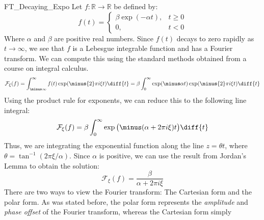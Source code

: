         \begin{lexample}{}{FT_Decaying_Expo}
            Let $f:\mathbb{R}\rightarrow\mathbb{R}$ be defined by:
            \begin{equation}
                f(t)=
                \begin{cases}
                    \beta\exp(\minus\alpha{t}),&t\geq{0}\\
                    0,&t<0
                \end{cases}
            \end{equation}
            Where $\alpha$ and $\beta$ are positive real numbers.
            Since $f(t)$ decays to zero rapidly as
            $t\rightarrow\infty$, we see that $f$ is a
            Lebesgue integrable function and has a Fourier
            transform. We can compute this using the standard
            methods obtained from a course on integral calculus.
            \begin{equation}
                \mathcal{F}_{\xi}(f)=\int_{\minus\infty}^{\infty}f(t)
                                        \exp(\minus{2}\pi{i}\xi{t})\diff{t}
                                    =\beta\int_{0}^{\infty}
                                        \exp(\minus\alpha{t})
                                        \exp(\minus{2}\pi{i}\xi{t})\diff{t}
            \end{equation}
            Using the product rule for exponents, we can
            reduce this to the following line integral:
            \begin{equation}
                \mathcal{F}_{\xi}(f)=
                \beta\int_{0}^{\infty}\exp\big(
                    \minus(\alpha+2\pi{i}\xi)t\big)\diff{t}
            \end{equation}
            Thus, we are integrating the exponential function
            along the line $z=\theta{t}$, where
            $\theta=\tan^{\minus{1}}(2\pi\xi/\alpha)$.
            Since $\alpha$ is positive, we can use the result
            from Jordan's Lemma to obtain the solution:
            \begin{equation}
                \mathcal{F}_{\xi}(f)
                =\frac{\beta}{\alpha+2\pi{i}\xi}
            \end{equation}
            There are two ways to view the Fourier
            transform: The Cartesian form and the
            polar form. As was stated before, the
            polar form represents the \textit{amplitude}
            and \textit{phase offset} of the Fourier
            transform, whereas the Cartesian form simply

\end{lexample}
